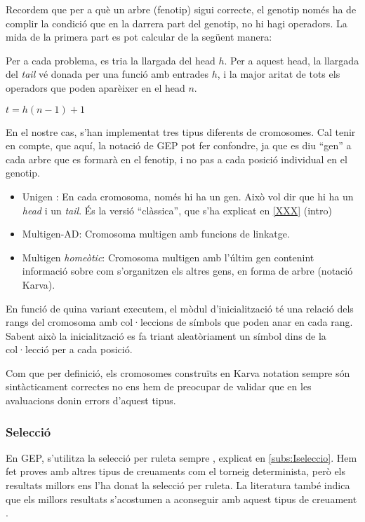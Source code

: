 Recordem que per a què un arbre (fenotip) sigui correcte, el genotip només ha de
complir la condició que en la darrera part del genotip, no hi hagi operadors.
La mida de la primera part es pot calcular de la següent manera:

Per a cada problema, es tria la llargada del head $h$.  Per a aquest head, la
llargada del \emph{tail} vé donada per una funció amb entrades $h$, i la major
aritat de tots els operadors que poden aparèixer en el head $n$.

\begin{math}
t =  h (n-1) + 1
\end{math}

En el nostre cas, s'han implementat tres tipus diferents de cromosomes. Cal
tenir en compte, que aquí, la notació de GEP pot fer confondre, ja que es diu
``gen'' a cada arbre que es formarà en el fenotip, i no pas a cada posició
individual en el genotip.

\begin{itemize}
	\item Unigen : En cada cromosoma, només hi ha un gen.  Això vol dir que hi
	ha un \emph{head} i un \emph{tail}. És la versió ``clàssica'', que s'ha
	explicat en \ref{XXX} (intro)
	\item Multigen-AD: Cromosoma multigen amb funcions de linkatge.
	\item Multigen \emph{homeòtic}: Cromosoma multigen amb l'últim gen contenint
	informació sobre com s'organitzen els altres gens, en forma de arbre
	(notació Karva).
\end{itemize}

En funció de quina variant executem, el mòdul  d'inicialització té una relació
dels rangs del cromosoma amb col·leccions de símbols que poden anar en cada
rang.  Sabent això la inicialització es fa triant aleatòriament un símbol dins
de la col·lecció per a cada posició.

Com que per definició, els cromosomes construïts en Karva notation sempre són
sintàcticament correctes no ens hem de preocupar de validar que en les
avaluacions donin errors d'aquest tipus.

\subsubsection{Selecció} %
\label{ssub:Seleccio}

En GEP, s'utilitza la selecció per ruleta sempre , explicat en
\ref{subs:Iseleccio}.  Hem fet proves amb altres tipus de creuaments com el
torneig determinista, però els resultats millors ens l'ha donat la selecció per
ruleta.  La literatura també indica que els millors resultats s'acostumen a
aconseguir amb aquest tipus de creuament
\cite{ferreira:2001,ferreira:2006,ferreira:2007}.

